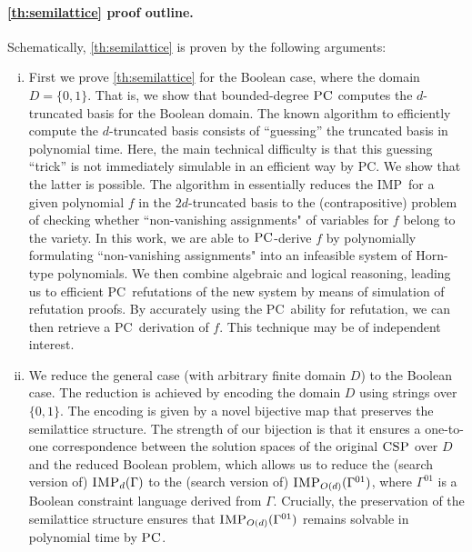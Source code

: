 \documentclass[11pt]{article}
\newcommand{\CSP}{\textsc{CSP}}
\newcommand{\IMP}{\textsc{IMP}}
\newcommand{\PC}{\textsc{PC}}
\newcommand{\1}{\textbf{1}}
\newcommand{\GB}{\text{Gr\"{o}bner} }
\begin{document}
\paragraph{\cref{th:semilattice} proof outline.}\label{sect:semilattice_structure}
Schematically, \cref{th:semilattice} is proven by the following arguments:
\begin{enumerate}[(i)]
    \item First we prove \cref{th:semilattice} for the Boolean case, where the domain $D = \{0,1\}$.
    That is, we show that bounded-degree $\PC$ computes the $d$-truncated \GB basis for the Boolean domain. The known \cite{Mastrolilli21TALG} algorithm to efficiently compute the $d$-truncated \GB basis consists of ``guessing'' the truncated \GB basis in polynomial time. Here, the main technical difficulty is that this guessing ``trick'' is not immediately simulable in an efficient way by \PC. We show that the latter is possible. The algorithm in \cite{Mastrolilli21TALG} essentially reduces the \IMP\ for a given polynomial $f$ in the $2d$-truncated \GB basis to the (contrapositive) problem of checking whether ``non-vanishing assignments" of variables for $f$ belong to the variety. In this work, we are able to $\PC$-derive $f$ by polynomially formulating ``non-vanishing assignments" into an infeasible system of Horn-type polynomials. We then combine algebraic and logical reasoning, leading us to efficient \PC\ refutations of the new system by means of simulation of refutation proofs. By accurately using the \PC\ ability for refutation, we can then retrieve a \PC\ derivation of $f$. This technique may be of independent interest.
    \item We reduce the general case (with arbitrary finite domain $D$) to the Boolean case. The reduction is achieved by encoding the domain $D$ using strings over $\{0,1\}$. The encoding is given by a novel bijective map that preserves the semilattice structure. The strength of our bijection is that it ensures a one-to-one correspondence between the solution spaces of the original $\CSP$ over $D$ and the reduced Boolean problem, which allows us to reduce the (search version of) $\IMP_d(\Gamma)$ to the (search version of) $\IMP_{O(d)}(\Gamma^{01})$, where $\Gamma^{01}$ is a Boolean constraint language derived from $\Gamma$. Crucially, the preservation of the semilattice structure ensures that $\IMP_{O(d)}(\Gamma^{01})$ remains solvable in polynomial time by $\PC$.
 
\end{enumerate}
\end{document}
